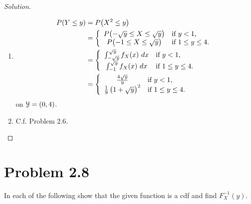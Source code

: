 \documentclass[12pt,letterpaper,reqno]{amsart}
\numberwithin{equation}{subsection}
\begin{document}
\begin{proof}[Solution]~\\
\begin{enumerate}[label=(\alph*),leftmargin=*]
    \item 
    
    \begin{align*}
        \fun{P}{Y \leq y} &= \fun{P}{X^2 \leq y} \\
                          &= \left\{ \begin{array}{cl}
                               \fun{P}{-\sqrt{y} \leq X \leq \sqrt{y}} & \mbox{if $y < 1$,} \\
                               \fun{P}{-1 \leq X \leq \sqrt{y}} & \mbox{if $1 \leq y \leq 4$.}
                          \end{array} \right. \\
                          &= \left\{ \begin{array}{cl}
                               \myint{f_X(x)}{x}{-\sqrt{y}}{\sqrt{y}} & \mbox{if $y < 1$,} \\
                               \myint{f_X(x)}{x}{-1}{\sqrt{y}} & \mbox{if $1 \leq y \leq 4$.}
                          \end{array} \right. \\
                         &= \left\{ \begin{array}{cl}
                               \frac{4 \sqrt{y}}{9} & \mbox{if $y < 1$,} \\
                               \frac{1}{9} \left( 1 + \sqrt{y} \right)^2 & \mbox{if $1 \leq y \leq 4$.}
                          \end{array} \right. \\
    \end{align*}
    on $\mycal{Y} = (0,4)$.
    
    \item C.f. Problem 2.6.
\end{enumerate}
\end{proof}

\newpage
\section{Problem 2.8}

In each of the following show that the given function is a cdf and find $F^{-1}_X(y)$.
\end{document}
